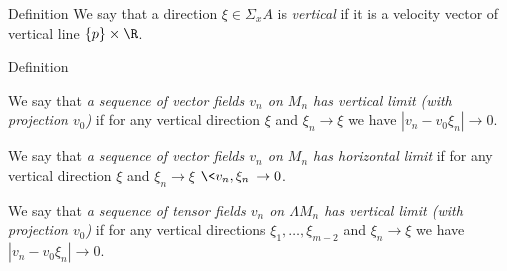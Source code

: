 \begin{thm}{Definition}
We say that a direction $\xi\in \Sigma_xA$ is \emph{vertical}
if it is a velocity vector of vertical line $\{p\}\times \R$.
\end{thm}

\begin{thm}{Definition}

We say that \textit{a sequence of vector fields $v_n$ on $M_n$  has vertical limit (with projection $v_0$)} if for any vertical direction $\xi$ and 
$\xi_n\to\xi$
we have $|v_n-v_0\xi_n|\to 0 $.


We say that \textit{a sequence of vector fields $v_n$ on $M_n$  has horizontal limit}
if for any vertical direction $\xi$ and 
$\xi_n\to\xi$
$\<v_n,\xi_n\>\to 0$.

We say that \textit{a sequence of tensor fields $v_n$ on $\Lambda M_n$  has vertical limit
(with projection $v_0$)} if for any vertical directions $\xi_1,\dots,\xi_{m-2}$ and 
$\xi_n\to\xi$
we have $|v_n-v_0\xi_n|\to 0 $.


\end{thm}

